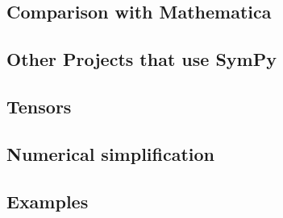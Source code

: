 \subsection{Comparison with Mathematica}



\subsection{Other Projects that use SymPy}




\subsection{Tensors}




\subsection{Numerical simplification}



\subsection{Examples}


